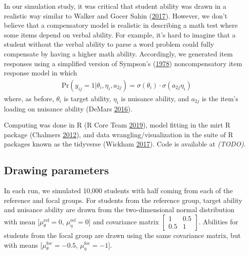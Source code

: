 \documentclass[
  11pt,
]{article}
\begin{document}
In our simulation study, it was critical that student ability was drawn in a realistic way similar to Walker and Gocer Sahin (\protect\hyperlink{ref-walker2017using}{2017}). However, we don't believe that a compensatory model is realistic in describing a math test where some items depend on verbal ability. For example, it's hard to imagine that a student without the verbal ability to parse a word problem could fully compensate by having a higher math ability. Accordingly, we generated item responses using a simplified version of Sympson's (\protect\hyperlink{ref-sympson1978model}{1978}) noncompensatory item response model in which
\begin{align}
\text{Pr}(y_{ij} = 1 | \theta_i, \eta_i, a_{2j}) = \sigma(\theta_i) \cdot \sigma(a_{2j}\eta_i)
\end{align}
where, as before, \(\theta_i\) is target ability, \(\eta_i\) is nuisance ability, and \(a_{2j}\) is the item's loading on nuisance ability (DeMars \protect\hyperlink{ref-demars2016partially}{2016}).

Computing was done in R (R Core Team \protect\hyperlink{ref-rcore}{2019}), model fitting in the mirt R package (Chalmers \protect\hyperlink{ref-chalmers2012mirt}{2012}), and data wrangling/visualization in the suite of R packages known as the tidyverse (Wickham \protect\hyperlink{ref-tidy}{2017}). Code is available at \emph{(TODO)}.

\hypertarget{drawing-parameters}{%
\subsection{Drawing parameters}\label{drawing-parameters}}

In each run, we simulated 10,000 students with half coming from each of the reference and focal groups. For students from the reference group, target ability and nuisance ability are drawn from the two-dimensional normal distribution with mean {[}\(\mu_\theta^\text{ref} = 0\), \(\mu_\eta^\text{ref} = 0\){]} and covariance matrix \(\begin{bmatrix} 1 & 0.5 \\ 0.5 & 1 \end{bmatrix}\). Abilities for students from the focal group are drawn using the same covariance matrix, but with means {[}\(\mu_\theta^\text{foc} = -0.5\), \(\mu_\eta^\text{foc} = -1\){]}.
\end{document}
